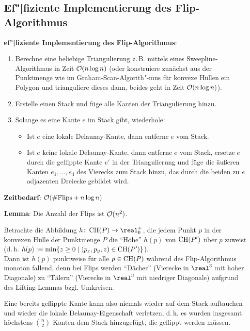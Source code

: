 \pagebreak

\subsection{%
    Ef"|fiziente Implementierung des Flip-Algorithmus%
}

\textbf{ef"|fiziente Implementierung des Flip-Algorithmus}:
\begin{enumerate}
    \item
    Berechne eine beliebige Triangulierung z.\,B. mittels eines Sweepline-Algorithmus in Zeit
    $\mathcal{O}(n \log n)$
    (oder konstruiere zunächst aus der Punktmenge wie im Graham-Scan-Algorith"-mus
    für konvexe Hüllen ein Polygon und trianguliere dieses dann, beides geht in Zeit
    $\mathcal{O}(n \log n)$).

    \item
    Erstelle einen Stack und füge alle Kanten der Triangulierung hinzu.

    \item
    Solange es eine Kante $e$ im Stack gibt, wiederhole:
    \begin{itemize}
        \item
        Ist $e$ eine lokale Delaunay-Kante, dann entferne $e$ vom Stack.

        \item
        Ist $e$ keine lokale Delaunay-Kante, dann entferne $e$ vom Stack,
        ersetze $e$ durch die geflippte Kante $e'$ in der Triangulierung und
        füge die äußeren Kanten $e_1, \dotsc, e_4$ des Vierecks zum Stack hinzu,
        das durch die beiden zu $e$ adjazenten Dreiecke gebildet wird.
    \end{itemize}
\end{enumerate}

\textbf{Zeitbedarf}: $\mathcal{O}(\text{\#Flips} + n\log n)$

\linie

\textbf{Lemma}:
Die Anzahl der Flips ist $\mathcal{O}(n^2)$.

\begin{Beweis}
    Betrachte die Abbildung $h\colon \CH(P) \rightarrow \real_0^+$,
    die jedem Punkt $p$ in der konvexen
    Hülle der Punktmenge $P$ die "`Höhe"' $h(p)$ von $\operatorname{CH}(P')$ über $p$ zuweist\\
    (d.\,h. $h(p) := \min\{z \ge 0 \;|\; (p_x, p_y, z) \in \operatorname{CH}(P')\}$).\\
    Dann ist $h(p)$ punktweise für alle $p \in \operatorname{CH}(P)$ während des Flip-Algorithmus monoton
    fallend, denn bei Flips werden "`Dächer"'
    (Vierecke in $\real^3$ mit hoher Diagonale)
    zu "`Tälern"' (Vierecke in $\real^3$ mit niedriger Diagonale)
    aufgrund des Lifting-Lemmas bzgl. Umkreisen.

    Eine bereits geflippte Kante kann also niemals wieder auf dem Stack auftauchen
    und wieder die lokale Delaunay-Eigenschaft verletzen,
    d.\,h. es wurden insgesamt höchstens $\binom{n}{2}$ Kanten dem Stack hinzugefügt,
    die geflippt werden müssen.
\end{Beweis}

